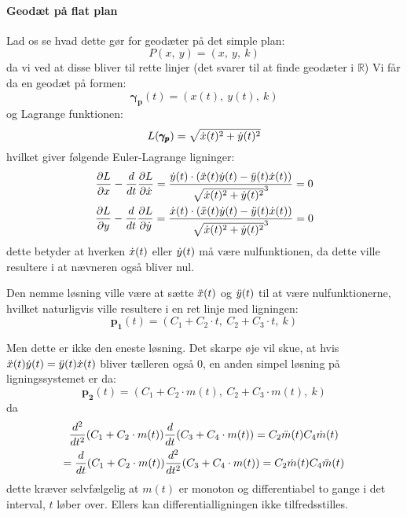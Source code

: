 \paragraph{Geodæt på flat plan}
Lad os se hvad dette gør for geodæter på det simple plan:
\begin{equation}\label{eq:P}
P(x,~y) = (x,~y,~k)
\end{equation}
da vi ved at disse bliver til rette linjer (det svarer til at finde geodæter i \(\mathbb{R}\))
%
Vi får da en geodæt på formen:
\begin{equation*}
\pmb{\gamma_p}(t) = (x(t),~y(t),~k)
\end{equation*}
%
og Lagrange funktionen:
\begin{equation*}
L(\pmb{\gamma_p}) = \sqrt{ \dot{x}(t)^2 + \dot{y}(t)^2 }
\end{equation*}
%
hvilket giver følgende Euler-Lagrange ligninger:
\begin{equation} \label{eq:ELPlanFlade}
\begin{gathered}
\frac{\partial L}{\partial x} - \frac{d}{d t} \frac{\partial L}{\partial \dot{x}} =
\frac{\dot{y}(t) \cdot ( \ddot{x}(t)\dot{y}(t) - \ddot{y}(t)\dot{x}(t) )}{\sqrt{\dot{x}(t)^2 + \dot{y}(t)^2}^3} = 0\\
\frac{\partial L}{\partial y} - \frac{d}{d t} \frac{\partial L}{\partial \dot{y}} =
\frac{\dot{x}(t) \cdot ( \ddot{x}(t)\dot{y}(t) - \ddot{y}(t)\dot{x}(t) )}{\sqrt{\dot{x}(t)^2 + \dot{y}(t)^2}^3} = 0\\
\end{gathered}
\end{equation}
%
dette betyder at hverken  \( \dot{x}(t) \) eller \(\dot{y}(t) \) må være nulfunktionen,
da dette ville resultere i at nævneren også bliver nul.

Den nemme løsning ville være at sætte \(\ddot{x}(t)\) og \(\ddot{y}(t)\) til at være nulfunktionerne,
hvilket naturligvis ville resultere i en ret linje med ligningen:
\begin{equation*}
\pmb{p_1}(t) = (C_1 + C_2\cdot t,~C_2 + C_3\cdot t,~k)
\end{equation*}

Men dette er ikke den eneste løsning. Det skarpe øje vil skue, at hvis
\( \ddot{x}(t)\dot{y}(t) = \ddot{y}(t)\dot{x}(t) \)
bliver tælleren også \(0\), en anden simpel løsning på ligningssystemet er da:
\begin{equation*}
\pmb{p_2}(t) = (C_1 + C_2\cdot m(t),~C_2 + C_3\cdot m(t),~k)
\end{equation*}
da
\begin{equation*}
\begin{gathered}
\frac{d^2}{dt^2} (C_1 + C_2\cdot m(t)) \frac{d}{dt} (C_3 + C_4\cdot m(t)) = C_2\ddot{m}(t) C_4\dot{m}(t) \\
 = \frac{d}{dt} (C_1 + C_2\cdot m(t)) \frac{d^2}{dt^2} (C_3 + C_4\cdot m(t)) = C_2\dot{m}(t) C_4\ddot{m}(t) 
\end{gathered}
\end{equation*}
dette kræver selvfælgelig at \( m(t) \) er monoton og differentiabel to gange i det interval, \(t\) løber over.
Ellers kan differentialligningen ikke tilfredsstilles.

